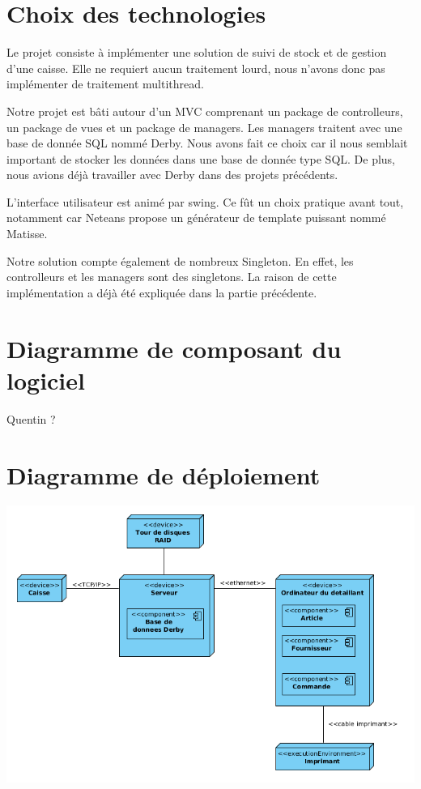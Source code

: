 \section{Choix des technologies}
Le projet consiste à implémenter une solution de suivi de stock et de gestion d'une caisse. Elle ne requiert aucun traitement lourd, nous n'avons donc pas implémenter de traitement multithread. 

Notre projet est bâti autour d'un MVC comprenant un package de controlleurs, un package de vues et un package de managers. Les managers traitent avec une base de donnée SQL nommé Derby. Nous avons fait ce choix car il nous semblait important de stocker les données dans une base de donnée type SQL. De plus, nous avions déjà travailler avec Derby dans des projets précédents.

L'interface utilisateur est animé par swing. Ce fût un choix pratique avant tout, notamment car Neteans propose un générateur de template puissant nommé Matisse.

Notre solution compte également de nombreux Singleton. En effet, les controlleurs et les managers sont des singletons. La raison de cette implémentation a déjà été expliquée dans la partie précédente.

\section{Diagramme de composant du logiciel}

Quentin ?

\section{Diagramme de déploiement}

\begin{center}
	\includegraphics[width=14cm]{./Conception/DiagrammeDeploiement}
\end{center}


